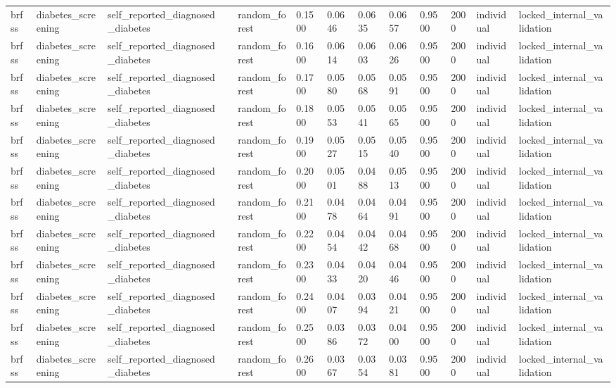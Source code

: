 \begin{tabular}{lllllllllllll}
brfss & diabetes\_screening & self\_reported\_diagnosed\_diabetes &  & random\_forest & 0.1500 & 0.0646 & 0.0635 & 0.0657 & 0.9500 & 2000 & individual & locked\_internal\_validation \\
brfss & diabetes\_screening & self\_reported\_diagnosed\_diabetes &  & random\_forest & 0.1600 & 0.0614 & 0.0603 & 0.0626 & 0.9500 & 2000 & individual & locked\_internal\_validation \\
brfss & diabetes\_screening & self\_reported\_diagnosed\_diabetes &  & random\_forest & 0.1700 & 0.0580 & 0.0568 & 0.0591 & 0.9500 & 2000 & individual & locked\_internal\_validation \\
brfss & diabetes\_screening & self\_reported\_diagnosed\_diabetes &  & random\_forest & 0.1800 & 0.0553 & 0.0541 & 0.0565 & 0.9500 & 2000 & individual & locked\_internal\_validation \\
brfss & diabetes\_screening & self\_reported\_diagnosed\_diabetes &  & random\_forest & 0.1900 & 0.0527 & 0.0515 & 0.0540 & 0.9500 & 2000 & individual & locked\_internal\_validation \\
brfss & diabetes\_screening & self\_reported\_diagnosed\_diabetes &  & random\_forest & 0.2000 & 0.0501 & 0.0488 & 0.0513 & 0.9500 & 2000 & individual & locked\_internal\_validation \\
brfss & diabetes\_screening & self\_reported\_diagnosed\_diabetes &  & random\_forest & 0.2100 & 0.0478 & 0.0464 & 0.0491 & 0.9500 & 2000 & individual & locked\_internal\_validation \\
brfss & diabetes\_screening & self\_reported\_diagnosed\_diabetes &  & random\_forest & 0.2200 & 0.0454 & 0.0442 & 0.0468 & 0.9500 & 2000 & individual & locked\_internal\_validation \\
brfss & diabetes\_screening & self\_reported\_diagnosed\_diabetes &  & random\_forest & 0.2300 & 0.0433 & 0.0420 & 0.0446 & 0.9500 & 2000 & individual & locked\_internal\_validation \\
brfss & diabetes\_screening & self\_reported\_diagnosed\_diabetes &  & random\_forest & 0.2400 & 0.0407 & 0.0394 & 0.0421 & 0.9500 & 2000 & individual & locked\_internal\_validation \\
brfss & diabetes\_screening & self\_reported\_diagnosed\_diabetes &  & random\_forest & 0.2500 & 0.0386 & 0.0372 & 0.0400 & 0.9500 & 2000 & individual & locked\_internal\_validation \\
brfss & diabetes\_screening & self\_reported\_diagnosed\_diabetes &  & random\_forest & 0.2600 & 0.0367 & 0.0354 & 0.0381 & 0.9500 & 2000 & individual & locked\_internal\_validation \\

\end{tabular}
